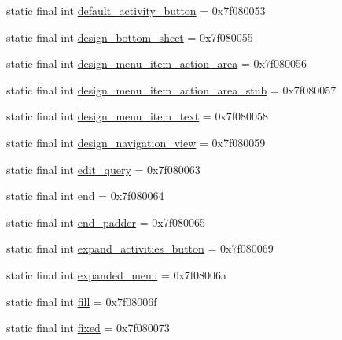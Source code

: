 \begin{DoxyCompactItemize}
\item 
static final int \mbox{\hyperlink{classandroid_1_1support_1_1design_1_1_r_1_1id_a1a434ee67ff2e4175b72e56f1a43d697}{default\+\_\+activity\+\_\+button}} = 0x7f080053
\item 
static final int \mbox{\hyperlink{classandroid_1_1support_1_1design_1_1_r_1_1id_aba38ef769e7a95935e5ae2f4fedea9d6}{design\+\_\+bottom\+\_\+sheet}} = 0x7f080055
\item 
static final int \mbox{\hyperlink{classandroid_1_1support_1_1design_1_1_r_1_1id_adb2647c3319106f9b429a3b5504f5ba5}{design\+\_\+menu\+\_\+item\+\_\+action\+\_\+area}} = 0x7f080056
\item 
static final int \mbox{\hyperlink{classandroid_1_1support_1_1design_1_1_r_1_1id_a8717eee55584a09abece563b626b9709}{design\+\_\+menu\+\_\+item\+\_\+action\+\_\+area\+\_\+stub}} = 0x7f080057
\item 
static final int \mbox{\hyperlink{classandroid_1_1support_1_1design_1_1_r_1_1id_ab894ddc87ea19e63dea6cc1573857be7}{design\+\_\+menu\+\_\+item\+\_\+text}} = 0x7f080058
\item 
static final int \mbox{\hyperlink{classandroid_1_1support_1_1design_1_1_r_1_1id_ad2aa9a71ea43bc8d7fdb4b1dee0c7528}{design\+\_\+navigation\+\_\+view}} = 0x7f080059
\item 
static final int \mbox{\hyperlink{classandroid_1_1support_1_1design_1_1_r_1_1id_a925f3d0551eda6274ab628e9e89ef681}{edit\+\_\+query}} = 0x7f080063
\item 
static final int \mbox{\hyperlink{classandroid_1_1support_1_1design_1_1_r_1_1id_a7cc4a2356792688c15effb564af06f50}{end}} = 0x7f080064
\item 
static final int \mbox{\hyperlink{classandroid_1_1support_1_1design_1_1_r_1_1id_a9803747fe0a09faf24a2ea39622fffe9}{end\+\_\+padder}} = 0x7f080065
\item 
static final int \mbox{\hyperlink{classandroid_1_1support_1_1design_1_1_r_1_1id_a6c97cb6330a1bda8b2c1f142c7bb8938}{expand\+\_\+activities\+\_\+button}} = 0x7f080069
\item 
static final int \mbox{\hyperlink{classandroid_1_1support_1_1design_1_1_r_1_1id_a5df7cf5b70c2db787dc229b79c1a7939}{expanded\+\_\+menu}} = 0x7f08006a
\item 
static final int \mbox{\hyperlink{classandroid_1_1support_1_1design_1_1_r_1_1id_a732bd99c00b6c445998253de74af48e5}{fill}} = 0x7f08006f
\item 
static final int \mbox{\hyperlink{classandroid_1_1support_1_1design_1_1_r_1_1id_a8c046e12f51095567fcff2b1f8df3f6b}{fixed}} = 0x7f080073

\end{DoxyCompactItemize}
